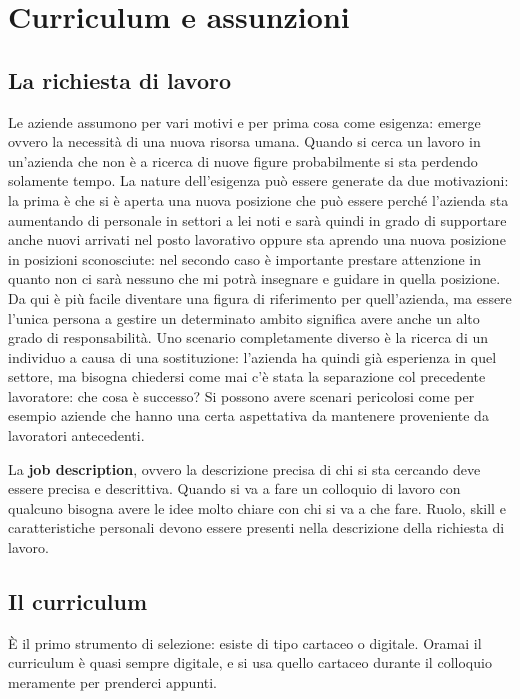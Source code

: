 \chapter{Curriculum e assunzioni}

\section{La richiesta di lavoro}
Le aziende assumono per vari motivi e per prima cosa come esigenza: emerge
ovvero la necessità di una nuova risorsa umana. Quando si cerca un lavoro in
un'azienda che non è a ricerca di nuove figure probabilmente si sta perdendo
solamente tempo. La nature dell'esigenza può essere generate da due
motivazioni: la prima è che si è aperta una nuova posizione che può essere
perché l'azienda sta aumentando di personale in settori a lei noti e sarà
quindi in grado di supportare anche nuovi arrivati nel posto lavorativo
oppure sta aprendo una nuova posizione in posizioni sconosciute: nel secondo
caso è importante prestare attenzione in quanto non ci sarà nessuno che mi
potrà insegnare e guidare in quella posizione. Da qui è più facile diventare
una figura di riferimento per quell'azienda, ma essere l'unica persona a
gestire un determinato ambito significa avere anche un alto grado di
responsabilità. Uno scenario completamente diverso è la ricerca di un individuo
a causa di una sostituzione: l'azienda ha quindi già esperienza in quel
settore, ma bisogna chiedersi come mai c'è stata la separazione col precedente
lavoratore: che cosa è successo? Si possono avere scenari pericolosi come per
esempio aziende che hanno una certa aspettativa da mantenere proveniente da
lavoratori antecedenti.

La \textbf{job description}, ovvero la descrizione precisa di chi si sta
cercando deve essere precisa e descrittiva. Quando si va a fare un colloquio di
lavoro con qualcuno bisogna avere le idee molto chiare con chi si va a che fare.
Ruolo, skill e caratteristiche personali devono essere presenti nella
descrizione della richiesta di lavoro. 

\section{Il curriculum}
È il primo strumento di selezione: esiste di tipo cartaceo o digitale. Oramai
il curriculum è quasi sempre digitale, e si usa quello cartaceo durante il
colloquio meramente per prenderci appunti.

